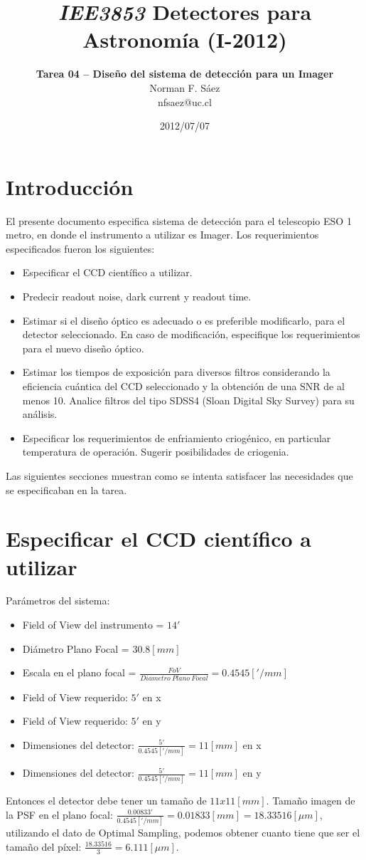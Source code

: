 \documentclass[a4paper,10pt]{article}
\title{\textit{IEE3853} Detectores para Astronomía (I-2012)}
\author{\textbf{Tarea 04 – Diseño del sistema de detección para un Imager} \\Norman F. Sáez\\nfsaez@uc.cl}
\date{2012/07/07}
\begin{document}
%
\section*{Introducción}

El presente documento especifica sistema de detección para el telescopio ESO 1
metro, en donde el instrumento a utilizar es Imager.  Los requerimientos
especificados fueron los siguientes:

\begin{itemize}
\item Especificar el CCD científico a utilizar.

\item Predecir readout noise, dark current y readout time.

\item Estimar si el diseño óptico es adecuado o es preferible modificarlo, para
el detector seleccionado. En caso de modificación, especifique los
requerimientos para el nuevo diseño óptico.

\item Estimar los tiempos de exposición para diversos filtros considerando la
eficiencia cuántica del CCD seleccionado y la obtención de una SNR de al menos
10. Analice filtros del tipo SDSS4 (Sloan Digital Sky Survey) para su análisis.

\item Especificar los requerimientos de enfriamiento criogénico, en particular
temperatura de operación. Sugerir posibilidades de criogenia.
\end{itemize}

Las siguientes secciones muestran como se intenta satisfacer las necesidades que se especificaban en la tarea.


\section{Especificar el CCD científico a utilizar}
Parámetros del sistema:
\begin{itemize}
\item Field of View del instrumento = $14 '$
\item Diámetro Plano Focal = $30.8 [mm]$
\item Escala en el plano focal = $\frac{FoV}{Diametro\ Plano\ Focal} = 0.4545 ['/mm]$
\item Field of View requerido: $5'$ en x
\item Field of View requerido: $5'$ en y
\item Dimensiones del detector: $\frac{5'}{0.4545['/mm]} = 11 [mm]$ en x
\item Dimensiones del detector: $\frac{5'}{0.4545['/mm]} = 11 [mm]$ en y
\end{itemize}
Entonces el detector debe tener un tamaño de $11x11[mm]$. 
Tamaño imagen de la PSF en el plano focal: $\frac{0.00833'}{0.4545 ['/mm]} = 0.01833[mm] = 18.33516 [\mu m]$, utilizando el dato de Optimal Sampling, podemos obtener cuanto tiene que ser el tamaño del píxel: $\frac{18.33516}{3} = 6.111 [\mu m]$.
\end{document}
